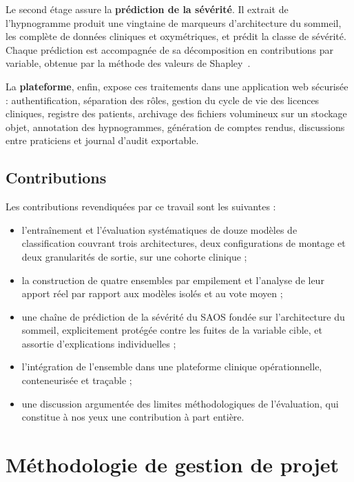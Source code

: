 Le second étage assure la \textbf{prédiction de la sévérité}. Il extrait de
l'hypnogramme produit une vingtaine de marqueurs d'architecture du sommeil, les
complète de données cliniques et oxymétriques, et prédit la classe de sévérité. Chaque
prédiction est accompagnée de sa décomposition en contributions par variable, obtenue
par la méthode des valeurs de Shapley~\cite{lundberg2017,lundberg2020}.

La \textbf{plateforme}, enfin, expose ces traitements dans une application web
sécurisée : authentification, séparation des rôles, gestion du cycle de vie des
licences cliniques, registre des patients, archivage des fichiers volumineux sur un
stockage objet, annotation des hypnogrammes, génération de comptes rendus,
discussions entre praticiens et journal d'audit exportable.

\subsection{Contributions}

Les contributions revendiquées par ce travail sont les suivantes :

\begin{itemize}[itemsep=2pt,topsep=4pt]
  \item l'entraînement et l'évaluation systématiques de douze modèles de
        classification couvrant trois architectures, deux configurations de montage
        et deux granularités de sortie, sur une cohorte clinique ;
  \item la construction de quatre ensembles par empilement et l'analyse de leur
        apport réel par rapport aux modèles isolés et au vote moyen ;
  \item une chaîne de prédiction de la sévérité du SAOS fondée sur l'architecture du
        sommeil, explicitement protégée contre les fuites de la variable cible, et
        assortie d'explications individuelles ;
  \item l'intégration de l'ensemble dans une plateforme clinique opérationnelle,
        conteneurisée et traçable ;
  \item une discussion argumentée des limites méthodologiques de l'évaluation, qui
        constitue à nos yeux une contribution à part entière.
\end{itemize}

\section{Méthodologie de gestion de projet}

